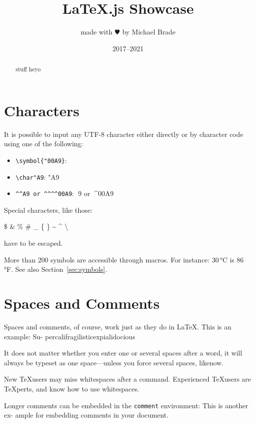 \documentclass{article}
\title{\LaTeX.js Showcase}
\author{made with $\varheartsuit$ by Michael Brade}
\date{2017--2021}
\begin{document}
\maketitle

\begin{abstract}
stuff heyo
\end{abstract}

\section{Characters}

It is possible to input any UTF-8 character either directly or by character code using one
of the following:

\begin{itemize}
  \item \texttt{\textbackslash symbol\{"00A9\}}: 
  \item \verb|\char"A9|: \char"A9
  \item \verb|^^A9 or ^^^^00A9|: ^^A9 or ^^^^00A9
\end{itemize}

\bigskip
\noindent
Special characters, like those:

\begin{center}
\$ \& \% \# \_ \{ \} \~{} \^{} \textbackslash
\end{center}

have to be escaped.

More than 200 symbols are accessible through macros. For instance: 30\,°C is 86\,°F.
See also Section~\ref{sec:symbols}.

\section{Spaces and Comments}

Spaces and comments, of course, work just as they do in \LaTeX. This is an example: Su-
percalifragilisticexpialidocious

It does not matter whether you enter one or several spaces after a word, it will always
be typeset as one space—unless you force several spaces, like\quad now.

New \TeX users may miss whitespaces after a command. Experienced \TeX users are
\TeX{}perts, and know how to use whitespaces.

Longer comments can be embedded in the \texttt{comment} environment: This is another ex-
ample for embedding comments in your document.
\end{document}
